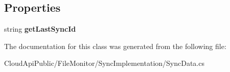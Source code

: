 \subsection*{Properties}
\begin{DoxyCompactItemize}
\item 
\hypertarget{class_cloud_api_public_1_1_file_monitor_1_1_sync_implementation_1_1_sync_data_a62814239485178d07f3560cd5d6c9724}{string {\bfseries get\-Last\-Sync\-Id}}\label{class_cloud_api_public_1_1_file_monitor_1_1_sync_implementation_1_1_sync_data_a62814239485178d07f3560cd5d6c9724}

\end{DoxyCompactItemize}


The documentation for this class was generated from the following file\-:\begin{DoxyCompactItemize}
\item 
Cloud\-Api\-Public/\-File\-Monitor/\-Sync\-Implementation/Sync\-Data.\-cs\end{DoxyCompactItemize}
